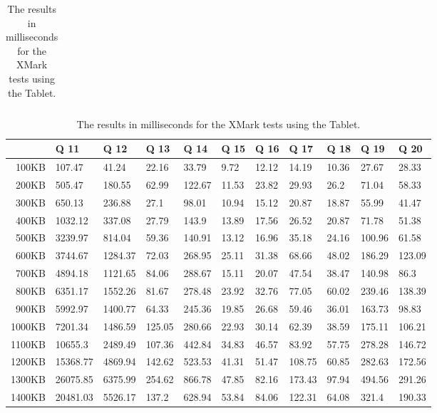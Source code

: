 \begin {table}[htpb]
\begin{tabular}{r|l|l|l|l|l|l|l|l|l|l}
\end{tabular}
\newline
\vspace*{0.5 cm}
\newline
\hspace*{-1.5cm}\begin{tabular}{r|l|l|l|l|l|l|l|l|l|l}
&Q 11&Q 12&Q 13&Q 14&Q 15&Q 16&Q 17&Q 18&Q 19&Q 20\\
\hline
100KB&107.47&41.24&22.16&33.79&9.72&12.12&14.19&10.36&27.67&28.33\\
200KB&505.47&180.55&62.99&122.67&11.53&23.82&29.93&26.2&71.04&58.33\\
300KB&650.13&236.88&27.1&98.01&10.94&15.12&20.87&18.87&55.99&41.47\\
400KB&1032.12&337.08&27.79&143.9&13.89&17.56&26.52&20.87&71.78&51.38\\
500KB&3239.97&814.04&59.36&140.91&13.12&16.96&35.18&24.16&100.96&61.58\\
600KB&3744.67&1284.37&72.03&268.95&25.11&31.38&68.66&48.02&186.29&123.09\\
700KB&4894.18&1121.65&84.06&288.67&15.11&20.07&47.54&38.47&140.98&86.3\\
800KB&6351.17&1552.26&81.67&278.48&23.92&32.76&77.05&60.02&239.46&138.39\\
900KB&5992.97&1400.77&64.33&245.36&19.85&26.68&59.46&36.01&163.73&98.83\\
1000KB&7201.34&1486.59&125.05&280.66&22.93&30.14&62.39&38.59&175.11&106.21\\
1100KB&10655.3&2489.49&107.36&442.84&34.83&46.57&83.92&57.75&278.28&146.72\\
1200KB&15368.77&4869.94&142.62&523.53&41.31&51.47&108.75&60.85&282.63&172.56\\
1300KB&26075.85&6375.99&254.62&866.78&47.85&82.16&173.43&97.94&494.56&291.26\\
1400KB&20481.03&5526.17&137.2&628.94&53.84&84.06&122.31&64.08&321.4&190.33\\
 \end{tabular}
\caption{The results in milliseconds for the XMark tests using the Tablet.}
\label{tab:xmark-tablet}
\end {table}
